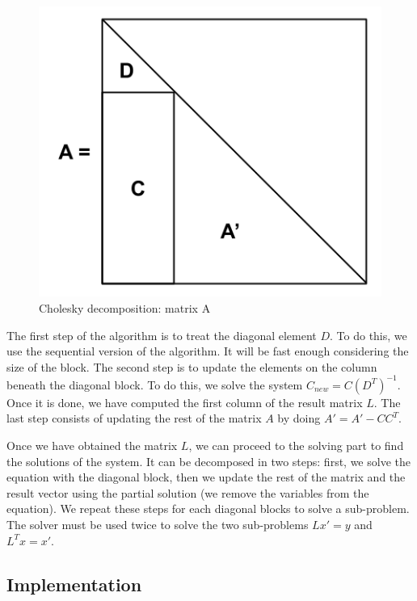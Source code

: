 \begin{figure}[!ht]
  \begin{center}
    \includegraphics[scale=0.4]{img/cho-img/cho_block_dec_A.png}
    \caption{Cholesky decomposition: matrix A}
    \label{fig:chodeca}
  \end{center}
\end{figure}

The first step of the algorithm is to treat the diagonal element $D$. To do
this, we use the sequential version of the algorithm. It will be fast enough
considering the size of the block. The second step is to update the elements on
the column beneath the diagonal block. To do this, we solve the system $C_{new}
= C(D^{T})^{-1}$. Once it is done, we have computed the first column of the
result matrix $L$. The last step consists of updating the rest of the matrix $A$
by doing $A' = A' - CC^{T}$.

Once we have obtained the matrix $L$, we can proceed to the solving part to find
the solutions of the system. It can be decomposed in two steps: first, we solve
the equation with the diagonal block, then we update the rest of the matrix and
the result vector using the partial solution (we remove the variables from the
equation). We repeat these steps for each diagonal blocks to solve a
sub-problem. The solver must be used twice to solve the two sub-problems  $Lx' =
y$ and $L^{T}x = x'$.

\subsection{Implementation}

